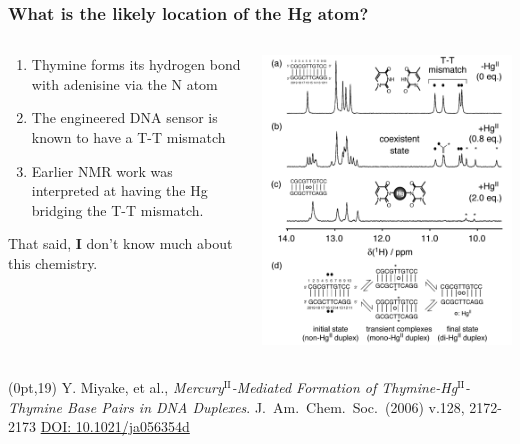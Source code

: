 \documentclass[10pt, xcolor=x11names, compress]{beamer}
\begin{document}
\begin{frame}
  \frametitle{What is the likely location of the Hg atom?}
  \begin{columns}
    \begin{column}{0.6\linewidth}
      \begin{enumerate}
      \item Thymine forms its hydrogen bond with adenisine via the N
        atom
      \item The engineered DNA sensor is known to have a T-T mismatch
      \item Earlier NMR work was interpreted at having the Hg bridging
        the T-T mismatch.
      \end{enumerate}

      \bigskip

      \begin{alertblock}{}
        That said, \textbf{I} don't know much about this chemistry.
      \end{alertblock}
    \end{column}
    \begin{column}{0.4\linewidth}
      \includegraphics[width=\linewidth]{images/nmr.png}      
    \end{column}
  \end{columns}

  \begin{textblock*}{0.7\linewidth}(0pt,19\TPVertModule)%
    \tiny Y. Miyake, et al.,
    \textit{Mercury$^{\mathrm{II}}$-Mediated Formation of
      Thymine-Hg$^{\mathrm{II}}$-Thymine Base Pairs in DNA
      Duplexes}.  J.~Am.~Chem.~Soc.~(2006) v.128, 2172-2173
    \href{http://dx.doi.org/10.1021/ja056354d}{\color{Blue4}DOI:
      10.1021/ja056354d}
  \end{textblock*}
\end{frame}
\end{document}
